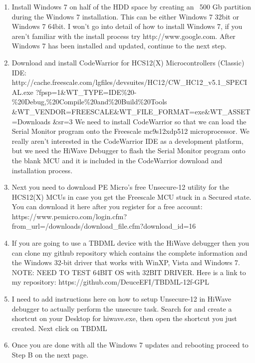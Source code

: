 \documentclass[12pt,notitlepage,onecolumn,oneside,draft]{memoir}
\begin{document}
\begin{enumerate}
\item Install Windows 7 on half of the HDD space by creating an ~500 Gb partition during the Windows 7 installation.
\textsf{This can be either Windows 7 32bit or Windows 7 64bit.  I won't go into detail of how to install Windows 7, if you aren't familiar with the install process try http://www.google.com.  After Windows 7 has been installed and updated, continue to the next step.}

\item Download and install CodeWarrior for HCS12(X) Microcontrollers (Classic) IDE: \newline
\textsf{http://cache.freescale.com/lgfiles/devsuites/HC12/CW\_HC12\_v5.1\_SPECIAL.exe \newline 
?fpsp=1\&WT\_TYPE=IDE\%20-\%20Debug,\%20Compile\%20and\%20Build\%20Tools \newline 
\&WT\_VENDOR=FREESCALE\&WT\_FILE\_FORMAT=exe\&WT\_ASSET=Downloads \newline
\&sr=3} \newline
\newline
\textsf{We need to install CodeWarrior so that we can load the Serial Monitor program onto the Freescale mc9s12xdp512 microprocessor.  We really aren't interested in the CodeWarrior IDE as a development platform, but we need the HiWave Debugger to flash the Serial Monitor program onto the blank MCU and it is included in the CodeWarrior download and installation process.}

\item Next you need to download PE Micro's free Unsecure-12 utility for the HCS12(X) MCUs in case you get the Freescale MCU stuck in a Secured state. You can download it here after you register for a free account: \newline
\textsf{https://www.pemicro.com/login.cfm?from\_url=/downloads/download\_file.cfm?download\_id=16}

\item If you are going to use a TBDML device with the HiWave debugger then you can clone my github repository which contains the complete information and the Windows 32-bit driver that works with WinXP, Vista and Windows 7. NOTE: NEED TO TEST 64BIT OS with 32BIT DRIVER.  Here is a link to my repository: https://github.com/DeuceEFI/TBDML-12f-GPL

\item I need to add instructions here on how to setup Unsecure-12 in HiWave debugger to actually perform the unsecure task.
Search for and create a shortcut on your Desktop for hiwave.exe, then open the shortcut you just created.  
Next click on TBDML

\item Once you are done with all the Windows 7 updates and rebooting proceed to Step B on the next page.
\end{enumerate}
\end{document}
